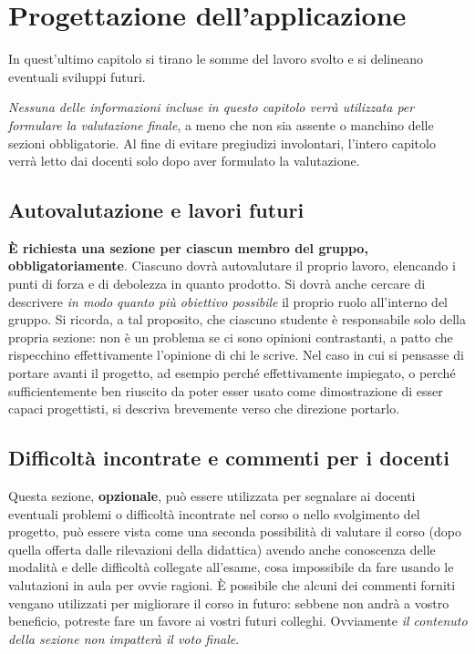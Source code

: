 \documentclass[a4paper,12pt]{report}
\begin{document}
\chapter{Progettazione dell'applicazione}

In quest'ultimo capitolo si tirano le somme del lavoro svolto e si delineano eventuali sviluppi
futuri.

\textit{Nessuna delle informazioni incluse in questo capitolo verrà utilizzata per formulare la valutazione finale}, a meno che non sia assente o manchino delle sezioni obbligatorie.
%
Al fine di evitare pregiudizi involontari, l'intero capitolo verrà letto dai docenti solo dopo aver formulato la valutazione.

\section{Autovalutazione e lavori futuri}

\textbf{È richiesta una sezione per ciascun membro del gruppo, obbligatoriamente}.
%
Ciascuno dovrà autovalutare il proprio lavoro, elencando i punti di forza e di debolezza in quanto prodotto.
Si dovrà anche cercare di descrivere \emph{in modo quanto più obiettivo possibile} il proprio ruolo all'interno del gruppo.
Si ricorda, a tal proposito, che ciascuno studente è responsabile solo della propria sezione: non è un problema se ci sono opinioni contrastanti, a patto che rispecchino effettivamente l'opinione di chi le scrive.
Nel caso in cui si pensasse di portare avanti il progetto, ad esempio perché effettivamente impiegato, o perché sufficientemente ben riuscito da poter esser usato come dimostrazione di esser capaci progettisti, si descriva brevemente verso che direzione portarlo.

\section{Difficoltà incontrate e commenti per i docenti}

Questa sezione, \textbf{opzionale}, può essere utilizzata per segnalare ai docenti eventuali problemi o difficoltà incontrate nel corso o nello svolgimento del progetto, può essere vista come una seconda possibilità di valutare il corso (dopo quella offerta dalle rilevazioni della didattica) avendo anche conoscenza delle modalità e delle difficoltà collegate all'esame, cosa impossibile da fare usando le valutazioni in aula per ovvie ragioni.
%
È possibile che alcuni dei commenti forniti vengano utilizzati per migliorare il corso in futuro: sebbene non andrà a vostro beneficio, potreste fare un favore ai vostri futuri colleghi.
%
Ovviamente \textit{il contenuto della sezione non impatterà il voto finale}.
\end{document}
